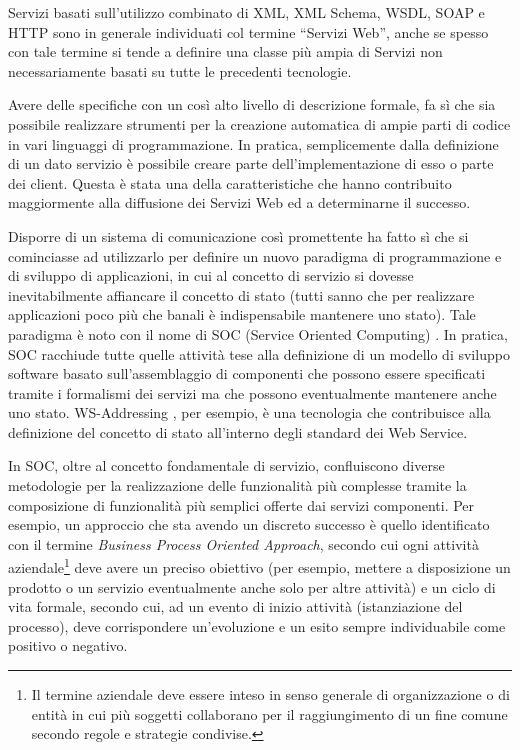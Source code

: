 Servizi basati sull'utilizzo combinato di XML, XML Schema, WSDL, SOAP e HTTP
sono in generale individuati col termine ``Servizi Web'', anche se spesso con
tale termine si tende a definire una classe più ampia di Servizi non necessariamente basati su tutte le
precedenti tecnologie.

Avere delle specifiche con un così alto livello di descrizione formale, fa sì
che sia possibile realizzare strumenti per la creazione
automatica di ampie parti di codice in vari linguaggi di programmazione. In
pratica, semplicemente dalla definizione di un dato servizio è possibile creare
parte dell'implementazione di esso o parte dei client. Questa è stata una della
caratteristiche che hanno contribuito maggiormente alla diffusione dei Servizi
Web ed a determinarne il successo.

Disporre di un sistema di comunicazione così promettente ha fatto sì che si
cominciasse ad utilizzarlo per definire un nuovo paradigma di programmazione e di
sviluppo di applicazioni, in cui al concetto di servizio si dovesse
inevitabilmente affiancare il concetto di stato (tutti sanno che per realizzare
applicazioni poco più che banali è indispensabile mantenere uno stato). Tale
paradigma è noto con il nome di SOC (Service Oriented Computing) \cite{SOC1}
\cite{WEBSERVICES}. In pratica, SOC racchiude tutte quelle attività tese alla
definizione di un modello di sviluppo software basato sull'assemblaggio di
componenti che possono essere specificati tramite i formalismi dei servizi ma che
possono eventualmente mantenere anche uno stato. WS-Addressing
\cite{WS-Addressing}, per esempio, è una tecnologia che contribuisce alla
definizione del concetto di stato all'interno degli standard dei Web Service.

In SOC, oltre al concetto fondamentale di servizio, confluiscono diverse
metodologie per la realizzazione delle funzionalità più complesse tramite la
composizione di funzionalità più semplici offerte dai servizi componenti. Per
esempio, un approccio che sta avendo un discreto successo è quello identificato
con il termine \emph{Business Process Oriented Approach}, secondo cui ogni
attività aziendale\footnote{Il termine aziendale deve essere inteso in senso
generale di organizzazione o di entità in cui più soggetti collaborano per il
raggiungimento di un fine comune secondo regole e strategie condivise.} deve
avere un preciso obiettivo (per esempio, mettere a disposizione un prodotto o un
servizio eventualmente anche solo per altre attività) e un ciclo di vita formale,
secondo cui, ad un evento di inizio attività (istanziazione del processo), deve
corrispondere un'evoluzione e un esito sempre individuabile come positivo o
negativo.


